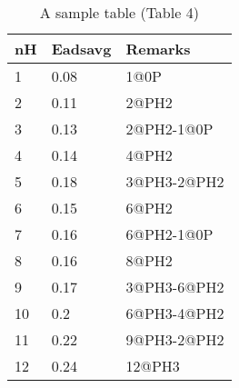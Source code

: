 
\begin{table}[ht]
\centering
\caption{A sample table (Table 4)}
\label{tab:table4}
\begin{tabular}{|l|l|l|}
\hline
nH & Eadsavg & Remarks \\ \hline
1 & 0.08 & 1@0P \\ \hline
2 & 0.11 & 2@PH2 \\ \hline
3 & 0.13 & 2@PH2-1@0P \\ \hline
4 & 0.14 & 4@PH2 \\ \hline
5 & 0.18 & 3@PH3-2@PH2 \\ \hline
6 & 0.15 & 6@PH2 \\ \hline
7 & 0.16 & 6@PH2-1@0P \\ \hline
8 & 0.16 & 8@PH2 \\ \hline
9 & 0.17 & 3@PH3-6@PH2 \\ \hline
10 & 0.2 & 6@PH3-4@PH2 \\ \hline
11 & 0.22 & 9@PH3-2@PH2 \\ \hline
12 & 0.24 & 12@PH3 \\ \hline

\end{tabular}
\end{table}
